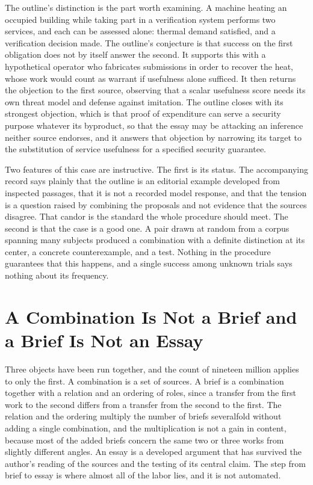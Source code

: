 \documentclass[11pt]{article}
\begin{document}
The outline's distinction is the part worth examining. A machine heating an occupied building while taking part in a verification system performs two services, and each can be assessed alone: thermal demand satisfied, and a verification decision made. The outline's conjecture is that success on the first obligation does not by itself answer the second. It supports this with a hypothetical operator who fabricates submissions in order to recover the heat, whose work would count as warrant if usefulness alone sufficed. It then returns the objection to the first source, observing that a scalar usefulness score needs its own threat model and defense against imitation. The outline closes with its strongest objection, which is that proof of expenditure can serve a security purpose whatever its byproduct, so that the essay may be attacking an inference neither source endorses, and it answers that objection by narrowing its target to the substitution of service usefulness for a specified security guarantee.

Two features of this case are instructive. The first is its status. The accompanying record says plainly that the outline is an editorial example developed from inspected passages, that it is not a recorded model response, and that the tension is a question raised by combining the proposals and not evidence that the sources disagree. That candor is the standard the whole procedure should meet. The second is that the case is a good one. A pair drawn at random from a corpus spanning many subjects produced a combination with a definite distinction at its center, a concrete counterexample, and a test. Nothing in the procedure guarantees that this happens, and a single success among unknown trials says nothing about its frequency.

\section{A Combination Is Not a Brief and a Brief Is Not an Essay}

Three objects have been run together, and the count of nineteen million applies to only the first. A combination is a set of sources. A brief is a combination together with a relation and an ordering of roles, since a transfer from the first work to the second differs from a transfer from the second to the first. The relation and the ordering multiply the number of briefs severalfold without adding a single combination, and the multiplication is not a gain in content, because most of the added briefs concern the same two or three works from slightly different angles. An essay is a developed argument that has survived the author's reading of the sources and the testing of its central claim. The step from brief to essay is where almost all of the labor lies, and it is not automated.
\end{document}
